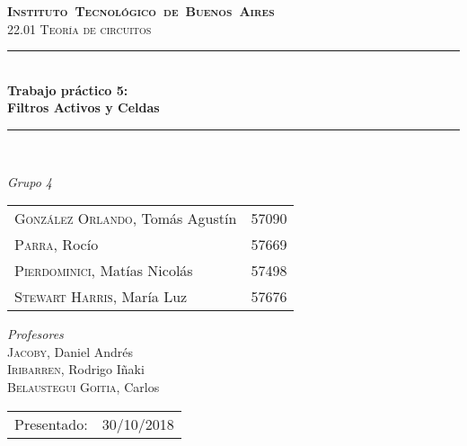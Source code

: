 \begin{titlepage}
\newcommand{\HRule}{\rule{\linewidth}{0.5mm}}
\center
\mbox{\textsc{\LARGE \bfseries {Instituto Tecnol\'ogico de Buenos Aires}}}\\[1.5cm]
\textsc{\Large 22.01 Teor\'ia de circuitos}\\[0.5cm]


\HRule \\[0.6cm]
{ \Huge \bfseries Trabajo pr\'actico 5: \\ Filtros Activos y Celdas}\\[0.4cm] %
\HRule \\[1.5cm]


{\large

\emph{Grupo 4}\\
\vspace{3px}

\begin{tabular}{lr} 	
\textsc{Gonz\'alez Orlando}, Tom\'as Agust\'in  & 57090 \\
\textsc{Parra}, Roc\'io  & 57669 \\ 	
\textsc{Pierdominici}, Mat\'ias Nicol\'as & 57498 \\
\textsc{Stewart Harris}, Mar\'ia Luz  & 57676 \\ 	     
\end{tabular}

\vspace{20px}

\emph{Profesores}\\
\vspace{3px}
\textsc{Jacoby,} Daniel Andr\'es\\ 	
\textsc{Iribarren,} Rodrigo I\~naki\\
\textsc{Belaustegui Goitia,} Carlos \\

\vspace{100px}

\begin{tabular}{ll}

Presentado: & 30/10/2018\\

\end{tabular}

}

\vfill

\end{titlepage}
